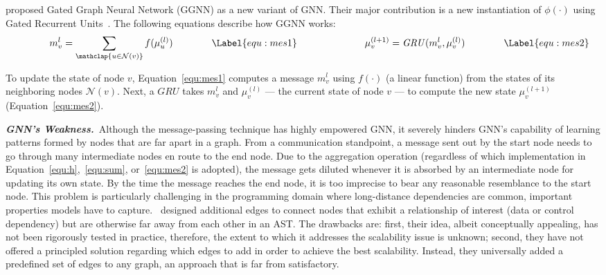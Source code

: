 \citet{li2015gated} proposed Gated Graph Neural Network (GGNN) as a new variant of GNN. Their major contribution is a new instantiation of $\phi(\cdot)$ using Gated Recurrent Units~\cite{cho-cho2014learning}. The following equations describe how GGNN works:
\begin{align*}
\qquad\qquad\,\,
{m}_v^l &= \sum_{\mathclap{u \in \mathcal{N}{(v)}}} f(\mu_{u}^{(l)}) \qquad\qquad\Label{equ:mes1} & 
\qquad\qquad\qquad
\mu^{(l+1)}_{v} &= \mathit{GRU}({m}_v^l, \mu^{(l)}_{v})\qquad\qquad\Label{equ:mes2}
\end{align*}

To update the state of node $v$, Equation~\ref{equ:mes1} computes a message ${m}_v^l$ using $f(\cdot)$ (\eg a linear function) from the states of its neighboring nodes $\mathcal{N}{(v)}$. Next, a $GRU$ takes ${m}_v^l$ and $\mu^{(l)}_{v}$ --- the current state of node $v$ --- to compute the new state $\mu^{(l+1)}_{v}$ (Equation~\ref{equ:mes2}). 

\vspace*{3pt}
\noindent
\textbf{\textit{GNN's Weakness.}}\,
Although the message-passing technique has highly empowered GNN, it severely hinders GNN's capability of learning patterns formed by nodes that are far apart in a graph. From a communication standpoint, 
a message 
sent out by the start node needs to go through many intermediate nodes en route to the end node. Due to the aggregation operation (regardless of which implementation in Equation~\ref{equ:h},~\ref{equ:sum}, or~\ref{equ:mes2} is adopted), the message gets diluted whenever it is absorbed by an intermediate node for updating its own state. By the time the message reaches the end node, it is too imprecise to bear any reasonable resemblance to the start node. This problem is particularly challenging in the programming domain where long-distance dependencies are common, important properties models have to capture.~\citet{allamanis2017learning} designed additional edges to connect nodes that exhibit a relationship of interest (\eg data or control dependency) but are otherwise far away from each other in an AST. The drawbacks are: first, their idea, albeit conceptually appealing, has not been rigorously tested in practice, therefore, the extent to which it addresses the scalability issue is unknown; second, they have not offered a principled solution regarding which edges to add in order to achieve the best scalability. Instead, they universally added a predefined set of edges to any graph, an approach that is far from satisfactory.

